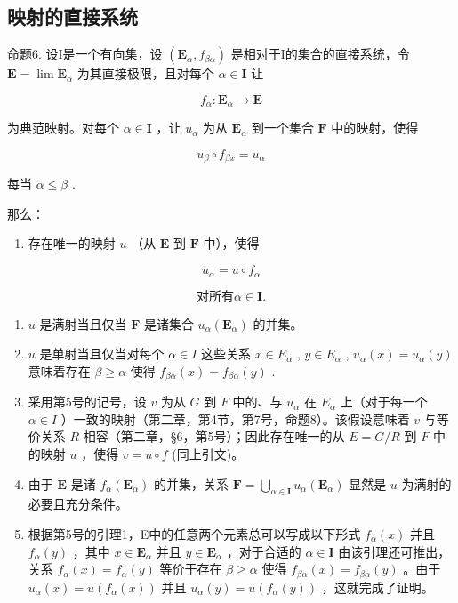 \subsection{映射的直接系统}

命题6. 设I是一个有向集，设 \((\mathbf{E}_{\alpha}, f_{\beta \alpha})\) 是相对于I的集合的直接系统，令 \(\mathbf{E} = \lim \mathbf{E}_{\alpha}\) 为其直接极限，且对每个 \(\alpha \in \mathbf{I}\) 让

\[
f _ {\alpha}: \mathbf {E} _ {\alpha} \rightarrow \mathbf {E}
\]

为典范映射。对每个 \(\alpha \in \mathbf{I}\) ，让 \(u_{\alpha}\) 为从 \(\mathbf{E}_{\alpha}\) 到一个集合 \(\mathbf{F}\) 中的映射，使得

\[
u _ {\beta} \circ f _ {\beta x} = u _ {\alpha}\tag{23}
\]

每当 \(\alpha \leqslant \beta\) .

那么：

\begin{enumerate}
\def\labelenumi{(\alph{enumi})}
\tightlist
\item
  存在唯一的映射 \(u\) （从 \(\mathbf{E}\) 到 \(\mathbf{F}\) 中），使得
\end{enumerate}

\[
u _ {\alpha} = u \circ f _ {\alpha}\tag{24}
\]

\[
{\text{对所有}} \alpha \in \mathbf {I}.
\]

\begin{enumerate}
\def\labelenumi{(\alph{enumi})}
\setcounter{enumi}{1}
\item
  \(u\) 是满射当且仅当 \(\mathbf{F}\) 是诸集合 \(u_{\alpha}(\mathbf{E}_{\alpha})\) 的并集。
\item
  \(u\) 是单射当且仅当对每个 \(\alpha \in I\) 这些关系 \(x \in E_{\alpha}\) , \(y \in E_{\alpha}\) , \(u_{\alpha}(x) = u_{\alpha}(y)\) 意味着存在 \(\beta \geqslant \alpha\) 使得 \(f_{\beta \alpha}(x) = f_{\beta \alpha}(y)\) .
\item
  采用第5号的记号，设 \(v\) 为从 \(G\) 到 \(F\) 中的、与 \(u_{\alpha}\) 在 \(E_{\alpha}\) 上（对于每一个 \(\alpha \in I\) ）一致的映射（第二章，第4节，第7号，命题8）。该假设意味着 \(v\) 与等价关系 \(R\) 相容（第二章，§6，第5号）；因此存在唯一的从 \(E = G / R\) 到 \(F\) 中的映射 \(u\) ，使得 \(v = u \circ f\) (同上引文)。
\item
  由于 \(\mathbf{E}\) 是诸 \(f_{\alpha}(\mathbf{E}_{\alpha})\) 的并集，关系 \(\mathbf{F} = \bigcup_{\alpha \in \mathbf{I}} u_{\alpha}(\mathbf{E}_{\alpha})\) 显然是 \(u\) 为满射的必要且充分条件。
\item
  根据第5号的引理1，E中的任意两个元素总可以写成以下形式 \(f_{\alpha}(x)\) 并且 \(f_{\alpha}(y)\) ，其中 \(x \in \mathbf{E}_{\alpha}\) 并且 \(y \in \mathbf{E}_{\alpha}\) ，对于合适的 \(\alpha \in \mathbf{I}\) 由该引理还可推出，关系 \(f_{\alpha}(x) = f_{\alpha}(y)\) 等价于存在 \(\beta \geqslant \alpha\) 使得 \(f_{\beta \alpha}(x) = f_{\beta \alpha}(y)\) 。由于 \(u_{\alpha}(x) = u(f_{\alpha}(x))\) 并且 \(u_{\alpha}(y) = u(f_{\alpha}(y))\) ，这就完成了证明。
\end{enumerate}

